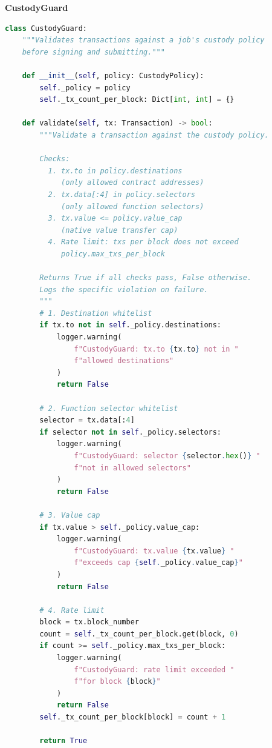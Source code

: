 \documentclass[11pt,a4paper]{article}
\begin{document}
\begin{contractbox}
\textbf{CustodyGuard}
\begin{lstlisting}[language=Python]
class CustodyGuard:
    """Validates transactions against a job's custody policy
    before signing and submitting."""

    def __init__(self, policy: CustodyPolicy):
        self._policy = policy
        self._tx_count_per_block: Dict[int, int] = {}

    def validate(self, tx: Transaction) -> bool:
        """Validate a transaction against the custody policy.

        Checks:
          1. tx.to in policy.destinations
             (only allowed contract addresses)
          2. tx.data[:4] in policy.selectors
             (only allowed function selectors)
          3. tx.value <= policy.value_cap
             (native value transfer cap)
          4. Rate limit: txs per block does not exceed
             policy.max_txs_per_block

        Returns True if all checks pass, False otherwise.
        Logs the specific violation on failure.
        """
        # 1. Destination whitelist
        if tx.to not in self._policy.destinations:
            logger.warning(
                f"CustodyGuard: tx.to {tx.to} not in "
                f"allowed destinations"
            )
            return False

        # 2. Function selector whitelist
        selector = tx.data[:4]
        if selector not in self._policy.selectors:
            logger.warning(
                f"CustodyGuard: selector {selector.hex()} "
                f"not in allowed selectors"
            )
            return False

        # 3. Value cap
        if tx.value > self._policy.value_cap:
            logger.warning(
                f"CustodyGuard: tx.value {tx.value} "
                f"exceeds cap {self._policy.value_cap}"
            )
            return False

        # 4. Rate limit
        block = tx.block_number
        count = self._tx_count_per_block.get(block, 0)
        if count >= self._policy.max_txs_per_block:
            logger.warning(
                f"CustodyGuard: rate limit exceeded "
                f"for block {block}"
            )
            return False
        self._tx_count_per_block[block] = count + 1

        return True
\end{lstlisting}
\end{contractbox}
\end{document}
